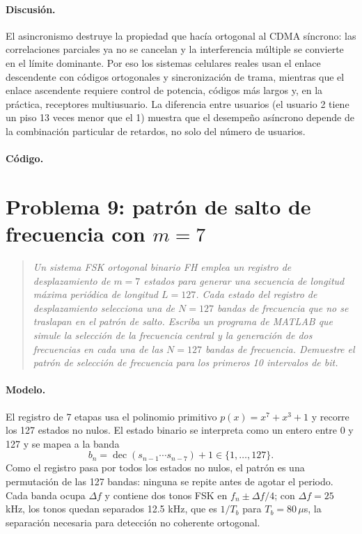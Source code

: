\documentclass[11pt,a4paper]{article}
\newcommand{\listado}[1]{%
  \VerbatimInput[fontsize=\scriptsize,breaklines=true,breakanywhere=true,
    frame=single,framesep=2pt,rulecolor=\color{gray!50},numbers=left,
    numbersep=4pt]{#1}}
\begin{document}
\paragraph{Discusión.} El asincronismo destruye la propiedad que hacía ortogonal
al CDMA síncrono: las correlaciones parciales ya no se cancelan y la
interferencia múltiple se convierte en el límite dominante. Por eso los sistemas
celulares reales usan el enlace descendente con códigos ortogonales y
sincronización de trama, mientras que el enlace ascendente requiere control de
potencia, códigos más largos y, en la práctica, receptores multiusuario. La
diferencia entre usuarios (el usuario 2 tiene un piso 13 veces menor que el 1)
muestra que el desempeño asíncrono depende de la combinación particular de
retardos, no solo del número de usuarios.

\paragraph{Código.}
\listado{problema08.m}

\section{Problema 9: patrón de salto de frecuencia con \texorpdfstring{$m=7$}{m=7}}

\begin{quote}
\itshape
Un sistema FSK ortogonal binario FH emplea un registro de desplazamiento de
$m=7$ estados para generar una secuencia de longitud máxima periódica de longitud
$L=127$. Cada estado del registro de desplazamiento selecciona una de $N=127$
bandas de frecuencia que no se traslapan en el patrón de salto. Escriba un
programa de MATLAB que simule la selección de la frecuencia central y la
generación de dos frecuencias en cada una de las $N=127$ bandas de frecuencia.
Demuestre el patrón de selección de frecuencia para los primeros 10 intervalos
de bit.
\end{quote}

\paragraph{Modelo.} El registro de 7 etapas usa el polinomio primitivo
$p(x)=x^7+x^3+1$ y recorre los 127 estados no nulos. El estado binario se
interpreta como un entero entre 0 y 127 y se mapea a la banda
\begin{equation}
  b_n=\operatorname{dec}(s_{n-1}\cdots s_{n-7})+1\in\{1,\dots,127\}.
\end{equation}
Como el registro pasa por todos los estados no nulos, el patrón es una
permutación de las 127 bandas: ninguna se repite antes de agotar el periodo.
Cada banda ocupa $\Delta f$ y contiene dos tonos FSK en
$f_n\pm\Delta f/4$; con $\Delta f=25$ kHz, los tonos quedan separados 12.5 kHz,
que es $1/T_b$ para $T_b=80\,\mu$s, la separación necesaria para detección no
coherente ortogonal.
\end{document}

